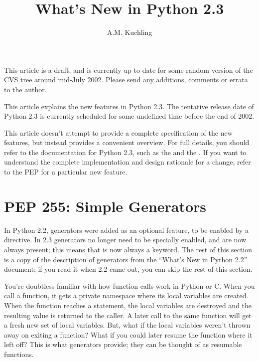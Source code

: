 \documentclass{howto}
\title{What's New in Python 2.3}
\author{A.M. Kuchling}
\begin{document}
\maketitle
\tableofcontents

%
%
%
%


{\large This article is a draft, and is currently up to date for some
random version of the CVS tree around mid-July 2002.  Please send any
additions, comments or errata to the author.}

This article explains the new features in Python 2.3.  The tentative
release date of Python 2.3 is currently scheduled for some undefined
time before the end of 2002.

This article doesn't attempt to provide a complete specification of
the new features, but instead provides a convenient overview.  For
full details, you should refer to the documentation for Python 2.3,
such as the
 and the
.  If you want to understand the complete
implementation and design rationale for a change, refer to the PEP for
a particular new feature.


\section{PEP 255: Simple Generators\label{section-generators}}

In Python 2.2, generators were added as an optional feature, to be
enabled by a  directive.  In
2.3 generators no longer need to be specially enabled, and are now
always present; this means that  is now always a
keyword.  The rest of this section is a copy of the description of
generators from the ``What's New in Python 2.2'' document; if you read
it when 2.2 came out, you can skip the rest of this section.

You're doubtless familiar with how function calls work in Python or C.
When you call a function, it gets a private namespace where its local
variables are created.  When the function reaches a 
statement, the local variables are destroyed and the resulting value
is returned to the caller.  A later call to the same function will get
a fresh new set of local variables. But, what if the local variables
weren't thrown away on exiting a function?  What if you could later
resume the function where it left off?  This is what generators
provide; they can be thought of as resumable functions.
\end{document}
